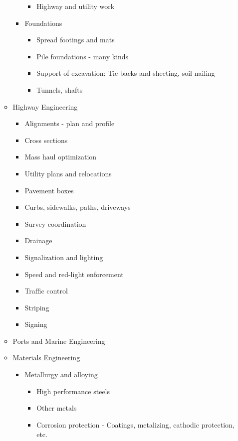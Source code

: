 \documentclass{article}
\begin{document}
\begin{itemize}
\begin{itemize}
\begin{itemize}
\begin{itemize}
                \item Highway and utility work
            \end{itemize}
            \item Foundations
            \begin{itemize}
                \item Spread footings and mats
                \item Pile foundations - many kinds
                \item Support of excavation: Tie-backs and sheeting, soil nailing
                \item Tunnels, shafts
            \end{itemize}
        \end{itemize}
        \item Highway Engineering
        \begin{itemize}
            \item Alignments - plan and profile
            \item Cross sections
            \item Mass haul optimization
            \item Utility plans and relocations
            \item Pavement boxes
            \item Curbs, sidewalks, paths, driveways
            \item Survey coordination
            \item Drainage
            \item Signalization and lighting
            \item Speed and red-light enforcement
            \item Traffic control
            \item Striping
            \item Signing
        \end{itemize}
        \item Ports and Marine Engineering
        \item Materials Engineering
        \begin{itemize}
            \item Metallurgy and alloying
            \begin{itemize}
                \item High performance steels
                \item Other metals
                \item Corrosion protection - Coatings, metalizing, cathodic protection, etc.

\end{itemize}
\end{itemize}
\end{itemize}
\end{itemize}
\end{document}
